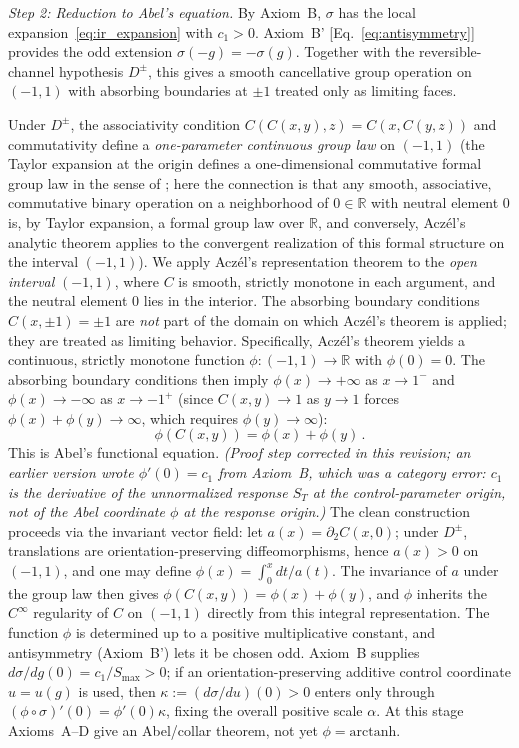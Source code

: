 \documentclass[aps,prd,twocolumn,superscriptaddress,nofootinbib]{revtex4-2}
\begin{document}
\textit{Step 2: Reduction to Abel's equation.}
By Axiom~B, $\sigma$ has the local expansion~\eqref{eq:ir_expansion} with $c_1 > 0$. Axiom~B' [Eq.~\eqref{eq:antisymmetry}] provides the odd extension $\sigma(-g)=-\sigma(g)$. Together with the reversible-channel hypothesis $D^\pm$, this gives a smooth cancellative group operation on $(-1,1)$ with absorbing boundaries at $\pm 1$ treated only as limiting faces.

Under $D^\pm$, the associativity condition $C(C(x,y),z) = C(x, C(y,z))$ and commutativity define a \textit{one-parameter continuous group law} on $(-1,1)$ (the Taylor expansion at the origin defines a one-dimensional commutative formal group law in the sense of \cite{Hazewinkel1978}; here the connection is that any smooth, associative, commutative binary operation on a neighborhood of $0 \in \mathbb{R}$ with neutral element $0$ is, by Taylor expansion, a formal group law over $\mathbb{R}$, and conversely, Acz\'el's analytic theorem applies to the convergent realization of this formal structure on the interval $(-1,1)$). We apply Acz\'el's representation theorem \cite{Aczel1966} to the \textit{open interval} $(-1,1)$, where $C$ is smooth, strictly monotone in each argument, and the neutral element $0$ lies in the interior. The absorbing boundary conditions $C(x, \pm 1) = \pm 1$ are \textit{not} part of the domain on which Acz\'el's theorem is applied; they are treated as limiting behavior. Specifically, Acz\'el's theorem yields a continuous, strictly monotone function $\phi: (-1,1) \to \mathbb{R}$ with $\phi(0) = 0$. The absorbing boundary conditions then imply $\phi(x) \to +\infty$ as $x \to 1^-$ and $\phi(x) \to -\infty$ as $x \to -1^+$ (since $C(x,y) \to 1$ as $y \to 1$ forces $\phi(x) + \phi(y) \to \infty$, which requires $\phi(y) \to \infty$):
\begin{equation}
\phi(C(x,y)) = \phi(x) + \phi(y)\,.
\label{eq:abel}
\end{equation}
This is Abel's functional equation. \emph{(Proof step corrected in this revision; an earlier version wrote $\phi'(0)=c_1$ from Axiom~B, which was a category error: $c_1$ is the derivative of the unnormalized response $S_T$ at the control-parameter origin, not of the Abel coordinate $\phi$ at the response origin.)} The clean construction proceeds via the invariant vector field: let $a(x) = \partial_2 C(x,0)$; under $D^\pm$, translations are orientation-preserving diffeomorphisms, hence $a(x) > 0$ on $(-1,1)$, and one may define $\phi(x) = \int_0^x dt/a(t)$. The invariance of $a$ under the group law then gives $\phi(C(x,y)) = \phi(x) + \phi(y)$, and $\phi$ inherits the $C^\infty$ regularity of $C$ on $(-1,1)$ directly from this integral representation. The function $\phi$ is determined up to a positive multiplicative constant, and antisymmetry (Axiom~B') lets it be chosen odd. Axiom~B supplies $d\sigma/dg(0)=c_1/S_{\max}>0$; if an orientation-preserving additive control coordinate $u=u(g)$ is used, then $\kappa:=(d\sigma/du)(0)>0$ enters only through $(\phi\circ\sigma)'(0)=\phi'(0)\kappa$, fixing the overall positive scale $\alpha$. At this stage Axioms~A--D give an Abel/collar theorem, not yet $\phi=\mathrm{arctanh}$.
\end{document}
